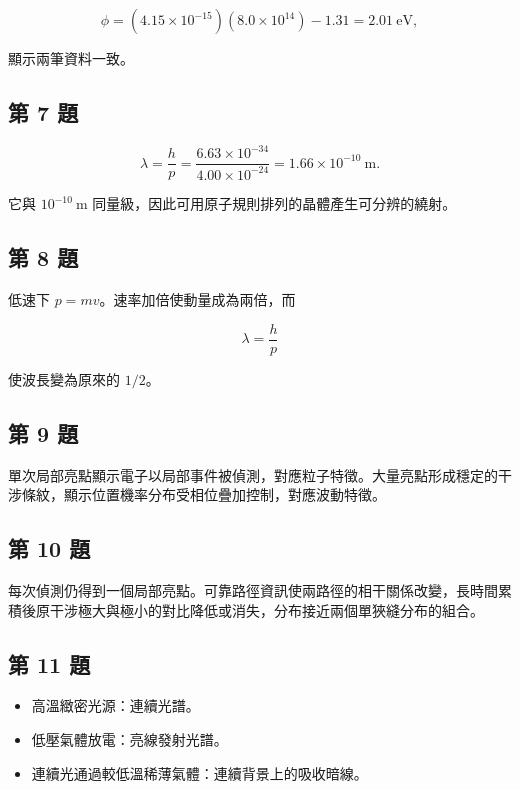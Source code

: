 \documentclass[11pt,a4paper]{article}
\providecommand{\tightlist}{%
  \setlength{\itemsep}{0pt}\setlength{\parskip}{0pt}}
\begin{document}
\[
\phi=(4.15\times10^{-15})(8.0\times10^{14})-1.31
=2.01\ \mathrm{eV},
\]

顯示兩筆資料一致。

\subsection{第 7 題}\label{ux7b2c-7-ux984c}

\[
\lambda=\frac{h}{p}
=\frac{6.63\times10^{-34}}{4.00\times10^{-24}}
=1.66\times10^{-10}\ \mathrm m.
\]

它與 \(10^{-10}\ \mathrm m\) 同量級，因此可用原子規則排列的晶體產生可分辨的繞射。

\subsection{第 8 題}\label{ux7b2c-8-ux984c}

低速下 \(p=mv\)。速率加倍使動量成為兩倍，而

\[
\lambda=\frac hp
\]

使波長變為原來的 \(1/2\)。

\subsection{第 9 題}\label{ux7b2c-9-ux984c}

單次局部亮點顯示電子以局部事件被偵測，對應粒子特徵。大量亮點形成穩定的干涉條紋，顯示位置機率分布受相位疊加控制，對應波動特徵。

\subsection{第 10 題}\label{ux7b2c-10-ux984c}

每次偵測仍得到一個局部亮點。可靠路徑資訊使兩路徑的相干關係改變，長時間累積後原干涉極大與極小的對比降低或消失，分布接近兩個單狹縫分布的組合。

\subsection{第 11 題}\label{ux7b2c-11-ux984c}

\begin{itemize}
\tightlist
\item
  高溫緻密光源：連續光譜。
\item
  低壓氣體放電：亮線發射光譜。
\item
  連續光通過較低溫稀薄氣體：連續背景上的吸收暗線。
\end{itemize}
\end{document}

